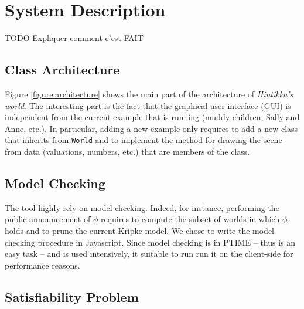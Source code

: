 \documentclass{article}
\begin{document}






\section{System Description}
\label{section:architecture}

TODO Expliquer comment c'est FAIT

\subsection{Class Architecture}

Figure \ref{figure:architecture} shows the main part of the architecture of \emph{Hintikka's world}. The interesting part is the fact that the graphical user interface (GUI) is independent from the current example that is running (muddy children, Sally and Anne, etc.). In particular, adding a new example only requires to add a new class that inherits from \texttt{World} and to implement the method for drawing the scene from data (valuations, numbers, etc.) that are members of the class.

\subsection{Model Checking}

The tool highly rely on model checking. Indeed, for instance, performing the public announcement of $\phi$ requires to compute the subset of worlds in which $\phi$ holds and to prune the current Kripke model. We chose to write the  model checking procedure in Javascript. Since model checking is in PTIME -- thus is an easy task -- and is used intensively, it suitable to run run it on the client-side  for performance reasons.

\subsection{Satisfiability Problem}
\end{document}
